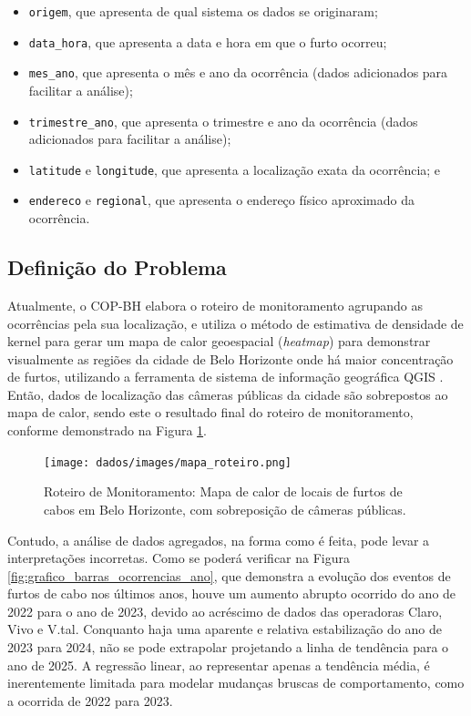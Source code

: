\begin{itemize}
  \item{\texttt{origem}, que apresenta de qual sistema os dados se originaram;}
  \item{\texttt{data\_hora}, que apresenta a data e hora em que o furto ocorreu;}
  \item{\texttt{mes\_ano}, que apresenta o mês e ano da ocorrência (dados adicionados para facilitar a análise);}
  \item{\texttt{trimestre\_ano}, que apresenta o trimestre e ano da ocorrência (dados adicionados para facilitar a análise);}
  \item{\texttt{latitude} e \texttt{longitude}, que apresenta a localização exata da ocorrência; e}
  \item{\texttt{endereco} e \texttt{regional}, que apresenta o endereço físico aproximado da ocorrência.}
\end{itemize}

\subsection{Definição do Problema}

Atualmente, o COP-BH elabora o roteiro de monitoramento agrupando as ocorrências pela sua localização, e utiliza o método de estimativa de densidade de kernel para gerar um mapa de calor geoespacial (\textit{heatmap}) \cite{Wilkinson2009} para demonstrar visualmente as regiões da cidade de Belo Horizonte onde há maior concentração de furtos, utilizando a ferramenta de sistema de informação geográfica QGIS \cite{Qgis}. Então, dados de localização das câmeras públicas da cidade são sobrepostos ao mapa de calor, sendo este o resultado final do roteiro de monitoramento, conforme demonstrado na Figura \ref{fig:mapa_roteiro}.

\begin{figure}[!htb]
  \captionsetup{singlelinecheck=false}
  \centering
  \texttt{[image: dados/images/mapa\_roteiro.png]}
  \caption{Roteiro de Monitoramento: Mapa de calor de locais de furtos de cabos em Belo Horizonte, com sobreposição de câmeras públicas.}
  \label{fig:mapa_roteiro}
\end{figure}

Contudo, a análise de dados agregados, na forma como é feita, pode levar a interpretações incorretas. Como se poderá verificar na Figura \ref{fig:grafico_barras_ocorrencias_ano}, que demonstra a evolução dos eventos de furtos de cabo nos últimos anos, houve um aumento abrupto ocorrido do ano de 2022 para o ano de 2023, devido ao acréscimo de dados das operadoras Claro, Vivo e V.tal. Conquanto haja uma aparente e relativa estabilização do ano de 2023 para 2024, não se pode extrapolar projetando a linha de tendência para o ano de 2025. A regressão linear, ao representar apenas a tendência média, é inerentemente limitada para modelar mudanças bruscas de comportamento, como a ocorrida de 2022 para 2023. 

